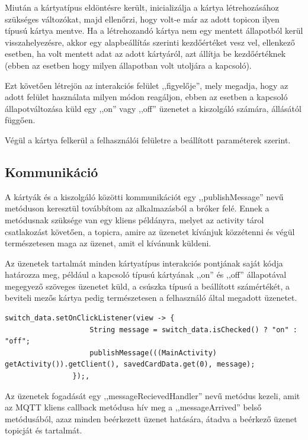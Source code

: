 \documentclass[]{thesis-ekf}
\theoremstyle{definition}
\theoremstyle{remark}
\begin{document}
Miután a kártyatípus eldöntésre került, inicializálja a kártya létrehozásához szükséges változókat, majd ellenőrzi, hogy volt-e már az adott topicon ilyen típusú kártya mentve.
Ha a létrehozandó kártya nem egy mentett állapotból kerül visszahelyezésre, akkor egy alapbeállítás 
szerinti kezdőértéket vesz vel, ellenkező esetben, ha volt mentett adat az adott kártyáról, azt állítja be kezdőértéknek
(ebben az esetben hogy milyen állapotban volt utoljára a kapcsoló).

Ezt követően létrejön az interakciós felület ,,figyelője'', mely megadja, hogy az adott felület használata
milyen módon reagáljon, ebben az esetben a kapcsoló állapotváltozása küld egy ,,on'' vagy ,,off'' üzenetet a
kiszolgáló számára, állásától függően.

Végül a kártya felkerül a felhasználói felületre a beállított paraméterek szerint.

\subsection{Kommunikáció}
A kártyák és a kiszolgáló közötti kommunikációt egy ,,publishMessage'' nevű metóduson keresztül továbbítom
az alkalmazásból a bróker felé. Ennek a metódusnak szüksége van egy kliens példányra, melyet az activity tárol
csatlakozást követően, a topicra, amire az üzenetet kívánjuk közzétenni és végül természetesen maga az üzenet, amit
el kívánunk küldeni.

Az üzenetek tartalmát minden kártyatípus interakciós pontjának saját kódja határozza meg, például
a kapcsoló típusú kártyának ,,on'' és ,,off'' állapotával megegyező szöveges üzenetet küld, a csúszka típusú
a beállított számértékét, a beviteli mezős kártya pedig természetesen a felhasználó által megadott üzenetet.

\lstset{language=Java}
\begin{lstlisting}[frame=single]
switch_data.setOnClickListener(view -> {
                    String message = switch_data.isChecked() ? "on" : "off";
                    publishMessage(((MainActivity) getActivity()).getClient(), savedCardData.get(0), message);
                });,
\end{lstlisting}

Az üzenetek fogadását egy ,,messageRecievedHandler'' nevű metódus kezeli, amit az MQTT kliens callback metódusa
hív meg a ,,messageArrived'' belső metódusából, azaz minden beérkezett üzenet hatására, átadva a beérkező üzenet topicját és tartalmát.
\end{document}
